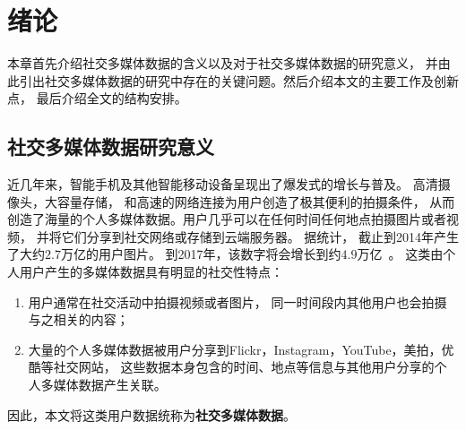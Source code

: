 \chapter{绪论}
本章首先介绍社交多媒体数据的含义以及对于社交多媒体数据的研究意义，
并由此引出社交多媒体数据的研究中存在的关键问题。然后介绍本文的主要工作及创新点，
最后介绍全文的结构安排。

\section{社交多媒体数据研究意义}
近几年来，智能手机及其他智能移动设备呈现出了爆发式的增长与普及。
高清摄像头，大容量存储， 和高速的网络连接为用户创造了极其便利的拍摄条件，
从而创造了海量的个人多媒体数据。用户几乎可以在任何时间任何地点拍摄图片或者视频，
并将它们分享到社交网络或存储到云端服务器。
据统计， 截止到2014年产生了大约$2.7$万亿的用户图片。
到2017年，该数字将会增长到约$4.9$万亿~\cite{phototrend}。
这类由个人用户产生的多媒体数据具有明显的社交性特点：
\begin{enumerate}
    \item 用户通常在社交活动中拍摄视频或者图片， 同一时间段内其他用户也会拍摄与之相关的内容；
    \item 大量的个人多媒体数据被用户分享到Flickr，Instagram，YouTube，美拍，优酷等社交网站，
        这些数据本身包含的时间、地点等信息与其他用户分享的个人多媒体数据产生关联。
\end{enumerate}
因此，本文将这类用户数据统称为\textbf{社交多媒体数据}。

